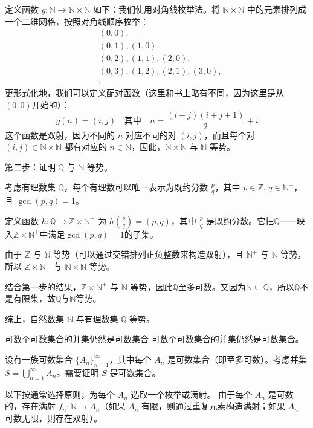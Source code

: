 定义函数 $g: \mathbb{N} \to \mathbb{N} \times \mathbb{N}$ 如下：我们使用对角线枚举法。将 $\mathbb{N} \times \mathbb{N}$ 中的元素排列成一个二维网格，按照对角线顺序枚举：
\begin{align*}
&(0,0), \\
&(0,1), (1,0), \\
&(0,2), (1,1), (2,0), \\
&(0,3), (1,2), (2,1), (3,0), \\
&\vdots
\end{align*}
更形式化地，我们可以定义配对函数（这里和书上略有不同，因为这里是从$(0,0)$开始的）：
\[
g(n) = (i,j) \quad \text{其中} \quad n = \frac{(i+j)(i+j+1)}{2} + i
\]
这个函数是双射，因为不同的 $n$ 对应不同的对 $(i,j)$，而且每个对 $(i,j) \in \mathbb{N} \times \mathbb{N}$ 都有对应的 $n \in \mathbb{N}$，因此，$\mathbb{N} \times \mathbb{N}$ 与 $\mathbb{N}$ 等势。

第二步：证明 $\mathbb{Q}$ 与 $\mathbb{N}$ 等势。

考虑有理数集 $\mathbb{Q}$，每个有理数可以唯一表示为既约分数 $\frac{p}{q}$，其中 $p \in \mathbb{Z}$, $q \in \mathbb{N}^+$，且 $\gcd(p,q) = 1$。

定义函数 $h: \mathbb{Q} \to \mathbb{Z} \times \mathbb{N}^+$ 为 $h\left(\frac{p}{q}\right) = (p,q)$，其中 $\frac{p}{q}$ 是既约分数。它把$\mathbb{Q}$一一映入$\mathbb{Z} \times \mathbb{N}^+$中满足$\gcd(p,q)=1$的子集。

由于 $\mathbb{Z}$ 与 $\mathbb{N}$ 等势（可以通过交错排列正负整数来构造双射），且 $\mathbb{N}^+$ 与 $\mathbb{N}$ 等势，所以 $\mathbb{Z} \times \mathbb{N}^+$ 与 $\mathbb{N} \times \mathbb{N}$ 等势。

结合第一步的结果，$\mathbb{Z} \times \mathbb{N}^+$ 与 $\mathbb{N}$ 等势，因此$\mathbb{Q}$至多可数。又因为$\mathbb{N}\subseteq\mathbb{Q}$，所以$\mathbb{Q}$不是有限集，故$\mathbb{Q}$与$\mathbb{N}$等势。

综上，自然数集 $\mathbb{N}$ 与有理数集 $\mathbb{Q}$ 等势。
\begin{theorem}{可数个可数集合的并集仍然是可数集合}{}
    可数个可数集合的并集仍然是可数集合。
    
    设有一族可数集合 $\{A_n\}_{n=1}^\infty$，其中每个 $A_n$ 是可数集合（即至多可数）。考虑并集 $S = \bigcup_{n=1}^\infty A_n$。需要证明 $S$ 是可数集合。
\end{theorem}
以下按通常选择原则，为每个 $A_n$ 选取一个枚举或满射。
由于每个 $A_n$ 是可数的，存在满射 $f_n: \mathbb{N} \to A_n$（如果 $A_n$ 有限，则通过重复元素构造满射；如果 $A_n$ 可数无限，则存在双射）。

